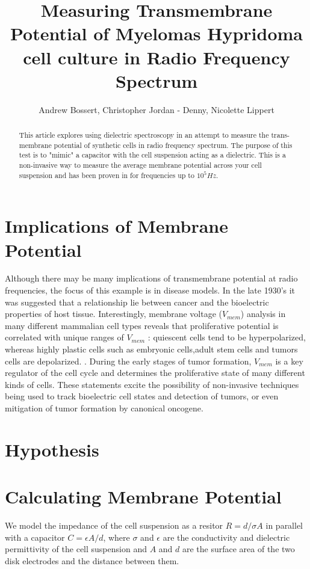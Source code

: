 \documentclass[journal]{IEEEtran}
\title{Measuring Transmembrane Potential of Myelomas Hypridoma cell culture in Radio Frequency Spectrum}
\author{Andrew Bossert, Christopher Jordan - Denny, Nicolette Lippert}
\begin{document}
\maketitle

\begin{abstract}
This article explores using dielectric spectroscopy in an attempt to measure the trans-membrane potential of synthetic cells in radio frequency spectrum. The purpose of this test is to "mimic" a capacitor with the cell suspension acting as a dielectric. This is a non-invasive way to measure the average membrane potential across your cell suspension and has been proven in \cite{Dielectric Spectroscopy} for frequencies up to \textbf{$10^5 Hz$}.
\end{abstract}

\section{Implications of Membrane Potential}
Although there may be many implications of transmembrane potential at radio frequencies, the focus of this example is in disease models. In the late 1930's it was suggested that a relationship lie between cancer and the bioelectric properties of host tissue. Interestingly, membrane voltage ($V_{mem}$) analysis in many different mammalian cell types reveals that proliferative potential is correlated with unique ranges of $V_{mem}$ : quiescent cells tend to be hyperpolarized, whereas highly plastic cells such as embryonic cells,adult stem cells and tumors cells are depolarized. \cite{TMP-implications}. During the early stages of tumor formation, $V_{mem}$ is a key regulator of the cell cycle and determines the proliferative state of many different kinds of cells. These statements excite the possibility of non-invasive techniques being used to track bioelectric cell states and detection of tumors, or even mitigation of tumor formation by canonical oncogene.

\section{Hypothesis}


\section{Calculating Membrane Potential}
We model the impedance of the cell suspension as a resitor $R = d/\sigma A$ in parallel with a capacitor $C = \epsilon A/d$, where $\sigma$ and $\epsilon$ are the conductivity and dielectric permittivity of the cell suspension and $A$ and $d$ are the surface area of the two disk electrodes and the distance between them. 
\end{document}
